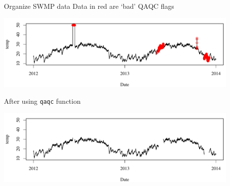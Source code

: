 \documentclass[serif]{beamer}\usepackage[]{graphicx}\usepackage[]{color}
\newenvironment{knitrout}{}{} %
\begin{document}
\begin{frame}[containsverbatim]{Organize SWMP data}
Data in red are `bad' QAQC flags
\begin{knitrout}
\color{fgcolor}

{\centering \includegraphics[width=0.9\textwidth]{fig/qaqc_ex1-1} 

}



\end{knitrout}
After using \texttt{qaqc} function
\begin{knitrout}
\color{fgcolor}

{\centering \includegraphics[width=0.9\textwidth]{fig/qaqc_ex2-1} 

}



\end{knitrout}
\end{frame}
\end{document}
